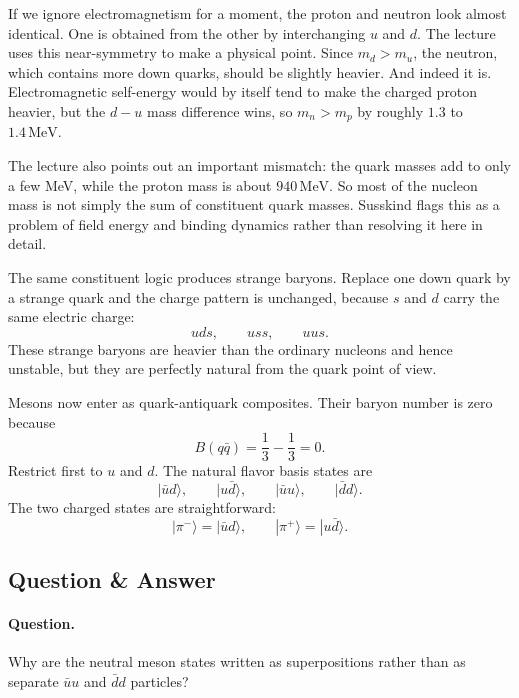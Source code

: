 If we ignore electromagnetism for a moment, the proton and neutron look almost identical. One is obtained from the other by interchanging \(u\) and \(d\). The lecture uses this near-symmetry to make a physical point. Since \(m_d>m_u\), the neutron, which contains more down quarks, should be slightly heavier. And indeed it is. Electromagnetic self-energy would by itself tend to make the charged proton heavier, but the \(d-u\) mass difference wins, so \(m_n>m_p\) by roughly \(1.3\) to \(1.4\,\mathrm{MeV}\).

\begin{remark}
The lecture also points out an important mismatch: the quark masses add to only a few MeV, while the proton mass is about \(940\,\mathrm{MeV}\). So most of the nucleon mass is not simply the sum of constituent quark masses. Susskind flags this as a problem of field energy and binding dynamics rather than resolving it here in detail.
\end{remark}

The same constituent logic produces strange baryons. Replace one down quark by a strange quark and the charge pattern is unchanged, because \(s\) and \(d\) carry the same electric charge:
\begin{equation}
uds,\qquad uss,\qquad uus.
\end{equation}
These strange baryons are heavier than the ordinary nucleons and hence unstable, but they are perfectly natural from the quark point of view.

Mesons now enter as quark-antiquark composites. Their baryon number is zero because
\begin{equation}
B(q\bar q)=\frac13-\frac13=0.
\end{equation}
Restrict first to \(u\) and \(d\). The natural flavor basis states are
\begin{equation}
|\bar u d\rangle,\qquad |u\bar d\rangle,\qquad |\bar u u\rangle,\qquad |\bar d d\rangle.
\end{equation}
The two charged states are straightforward:
\begin{equation}
|\pi^-\rangle = |\bar u d\rangle,
\qquad
|\pi^+\rangle = |u\bar d\rangle.
\end{equation}

\subsection{Question \& Answer}

\paragraph{Question.} Why are the neutral meson states written as superpositions rather than as separate \(\bar u u\) and \(\bar d d\) particles?

